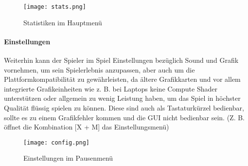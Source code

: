 \begin{figure}[H]
\centering
\texttt{[image: stats.png]}
\caption{Statistiken im Hauptmenü}
\label{img:gameStats}
\end{figure}



\paragraph{Einstellungen}

Weiterhin kann der Spieler im Spiel Einstellungen bezüglich Sound und Grafik vornehmen, um sein Spielerlebnis anzupassen, aber auch um die Plattformkompatibilität zu gewährleisten, da ältere Grafikkarten und vor allem integrierte Grafikeinheiten wie z. B. bei Laptops keine Compute Shader unterstützen oder allgemein zu wenig Leistung haben, um das Spiel in höchster Qualität flüssig spielen zu können. Diese sind auch als Tastaturkürzel bedienbar, sollte es zu einem Grafikfehler kommen und die GUI nicht bedienbar sein. (Z. B. öffnet die Kombination [X + M] das Einstellungsmenü)

\begin{figure}[H]
\centering
\texttt{[image: config.png]}
\caption{Einstellungen im Pausenmenü}
\label{img:gameConfig}
\end{figure}
